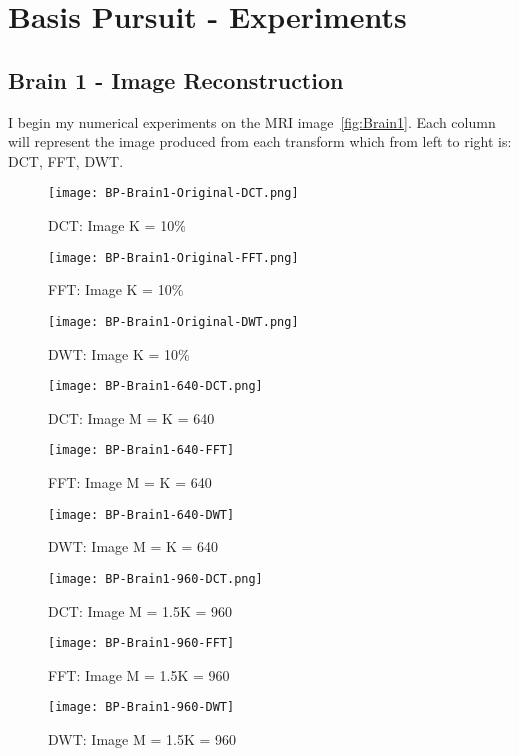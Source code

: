 \documentclass[titlepage,oneside, 12pt]{book}
\theoremstyle{break}
\begin{document}
\section{Basis Pursuit - Experiments}

\subsection{Brain 1 - Image Reconstruction}

I begin my numerical experiments on the MRI image~\ref{fig:Brain1}. Each column will represent the image produced from each transform which from left to right is: DCT, FFT, DWT. 

\begin{figure}[!h]
\centering
{}
  \texttt{[image: BP-Brain1-Original-DCT.png]}
  \caption{DCT: Image K = 10\%}\label{fig:BP-Brain1-Original-DCT}
\endminipage
\hspace*{2em}
  \texttt{[image: BP-Brain1-Original-FFT.png]}
  \caption{FFT: Image K = 10\%}\label{fig:BP-Brain1-Original-FFT}
\endminipage
\hspace*{2em}
%
  \texttt{[image: BP-Brain1-Original-DWT.png]}
  \caption{DWT: Image K = 10\%}\label{fig:BP-Brain1-Original-DWT}
\endminipage
\hspace*{2em}
\end{figure}

\begin{figure}[!h]
\centering
{}
  \texttt{[image: BP-Brain1-640-DCT.png]}
  \caption{DCT: Image M = K = 640}\label{fig:BP-Brain1-640-DCT}
\endminipage
\hspace*{2em}
  \texttt{[image: BP-Brain1-640-FFT]}
  \caption{FFT: Image M = K = 640}\label{fig:BP-Brain1-640-FFT}
\endminipage
\hspace*{2em}
%
  \texttt{[image: BP-Brain1-640-DWT]}
  \caption{DWT: Image M = K = 640}\label{fig:BP-Brain1-640-DWT}
\endminipage
\hspace*{2em}
\end{figure}

\begin{figure}[!h]
\centering
{}
  \texttt{[image: BP-Brain1-960-DCT.png]}
  \caption{DCT: Image M = 1.5K = 960}\label{fig:BP-Brain1-960-DCT}
\endminipage
\hspace*{2em}
  \texttt{[image: BP-Brain1-960-FFT]}
  \caption{FFT: Image M = 1.5K = 960}\label{fig:BP-Brain1-960-FFT}
\endminipage
\hspace*{2em}
%
  \texttt{[image: BP-Brain1-960-DWT]}
  \caption{DWT: Image M = 1.5K = 960}\label{fig:BP-Brain1-960-DWT}
\endminipage
\hspace*{2em}
\end{figure}
\end{document}
